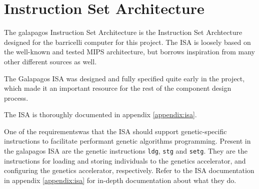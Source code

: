 \section{Instruction Set Architecture} \label{fpga:isa:s:isa}

The \Gls{galapagos} Instruction Set Architecture is the Instruction Set Archtecture designed for the \Gls{barricelli} computer for this project.
The ISA is loosely based on the well-known and tested MIPS architecture\cn, but borrows inspiration from many other different sources as well.

The Galapagos ISA was designed and fully specified quite early in the project, which made it an important resource for the rest of the component design process.

The ISA is thoroughly documented in appendix \vref{appendix:isa}.

One of the requirements\cn was that the ISA should support genetic-specific instructions to facilitate performant genetic algorithms programming.
Present in the \Gls{galapagos} ISA are the genetic instructions \texttt{ldg}, \texttt{stg} and \texttt{setg}.
They are the instructions for loading and storing \glspl{individual} to the genetics accelerator, and configuring the genetics accelerator, respectively.
Refer to the ISA documentation in appendix \vref{appendix:isa} for in-depth documentation about what they do.
